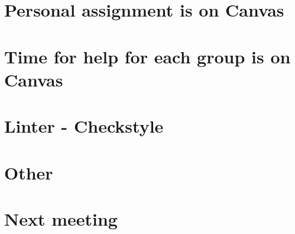 \documentclass{article}
\begin{document}
\begin{flushleft}
\section{Personal assignment is on Canvas}
\section{Time for help for each group is on Canvas}
\section{Linter - Checkstyle}

\section{Other}
\section{Next meeting}
 


\end{flushleft}
\end{document}
